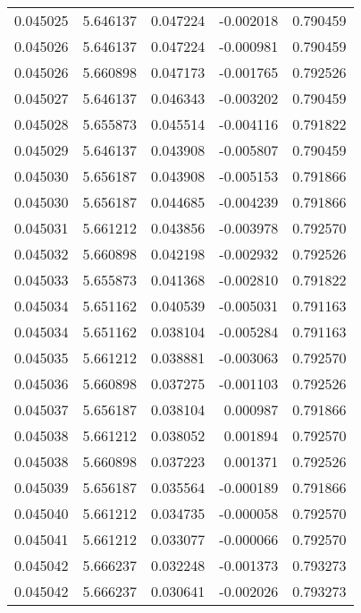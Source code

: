 \begin{tabular}{lrrrr}
0.045025    &  5.646137 &  0.047224 & -0.002018 &             0.790459 \\
0.045026    &  5.646137 &  0.047224 & -0.000981 &             0.790459 \\
0.045026    &  5.660898 &  0.047173 & -0.001765 &             0.792526 \\
0.045027    &  5.646137 &  0.046343 & -0.003202 &             0.790459 \\
0.045028    &  5.655873 &  0.045514 & -0.004116 &             0.791822 \\
0.045029    &  5.646137 &  0.043908 & -0.005807 &             0.790459 \\
0.045030    &  5.656187 &  0.043908 & -0.005153 &             0.791866 \\
0.045030    &  5.656187 &  0.044685 & -0.004239 &             0.791866 \\
0.045031    &  5.661212 &  0.043856 & -0.003978 &             0.792570 \\
0.045032    &  5.660898 &  0.042198 & -0.002932 &             0.792526 \\
0.045033    &  5.655873 &  0.041368 & -0.002810 &             0.791822 \\
0.045034    &  5.651162 &  0.040539 & -0.005031 &             0.791163 \\
0.045034    &  5.651162 &  0.038104 & -0.005284 &             0.791163 \\
0.045035    &  5.661212 &  0.038881 & -0.003063 &             0.792570 \\
0.045036    &  5.660898 &  0.037275 & -0.001103 &             0.792526 \\
0.045037    &  5.656187 &  0.038104 &  0.000987 &             0.791866 \\
0.045038    &  5.661212 &  0.038052 &  0.001894 &             0.792570 \\
0.045038    &  5.660898 &  0.037223 &  0.001371 &             0.792526 \\
0.045039    &  5.656187 &  0.035564 & -0.000189 &             0.791866 \\
0.045040    &  5.661212 &  0.034735 & -0.000058 &             0.792570 \\
0.045041    &  5.661212 &  0.033077 & -0.000066 &             0.792570 \\
0.045042    &  5.666237 &  0.032248 & -0.001373 &             0.793273 \\
0.045042    &  5.666237 &  0.030641 & -0.002026 &             0.793273 \\

\end{tabular}
